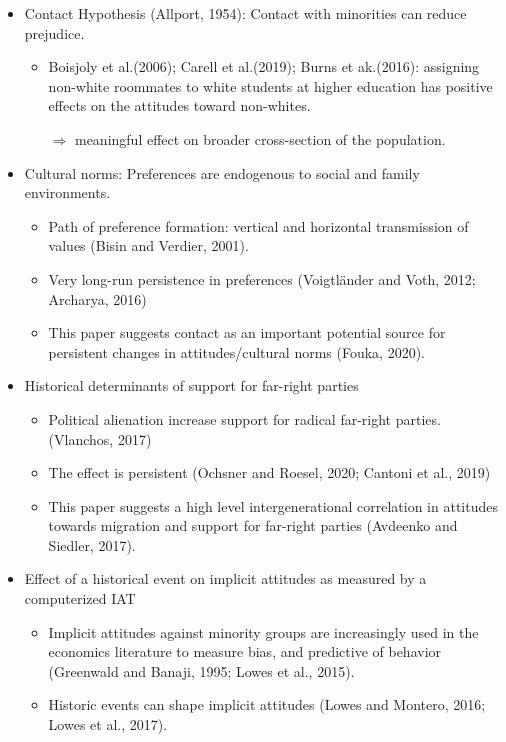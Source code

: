 \documentclass[../root]{subfiles}
\begin{document}
    \begin{itemize}
      \item Contact Hypothesis (Allport, 1954): Contact with minorities can reduce prejudice.
      \begin{itemize}
        \item Boisjoly et al.(2006); Carell et al.(2019); Burns et ak.(2016): assigning non-white roommates to white students at higher education has positive effects on the attitudes toward non-whites.

        $\Rightarrow$ meaningful effect on broader cross-section of the population.
      \end{itemize}
      \item Cultural norms: Preferences are endogenous to social and family environments.
      \begin{itemize}
        \item Path of preference formation: vertical and horizontal transmission of values (Bisin and Verdier, 2001).
        \item Very long-run persistence in preferences (Voigtl\"{a}nder and Voth, 2012; Archarya, 2016)
        \item This paper suggests contact as an important potential source for persistent changes in attitudes/cultural norms (Fouka, 2020).
      \end{itemize}
      \item Historical determinants of support for far-right parties
      \begin{itemize}
        \item Political alienation increase support for radical far-right parties.(Vlanchos, 2017)
        \item The effect is persistent (Ochsner and Roesel, 2020; Cantoni et al., 2019)
        \item This paper suggests a high level intergenerational correlation in attitudes towards migration and support for far-right parties (Avdeenko and Siedler, 2017).
      \end{itemize}
      \item Effect of a historical event on implicit attitudes as measured by a computerized IAT
      \begin{itemize}
        \item Implicit attitudes against minority groups are increasingly used in the economics literature to measure bias, and predictive of behavior (Greenwald and Banaji, 1995; Lowes et al., 2015). 
        \item Historic events can shape implicit attitudes (Lowes and Montero, 2016; Lowes et al., 2017).
      \end{itemize}
    \end{itemize}
\end{document}
